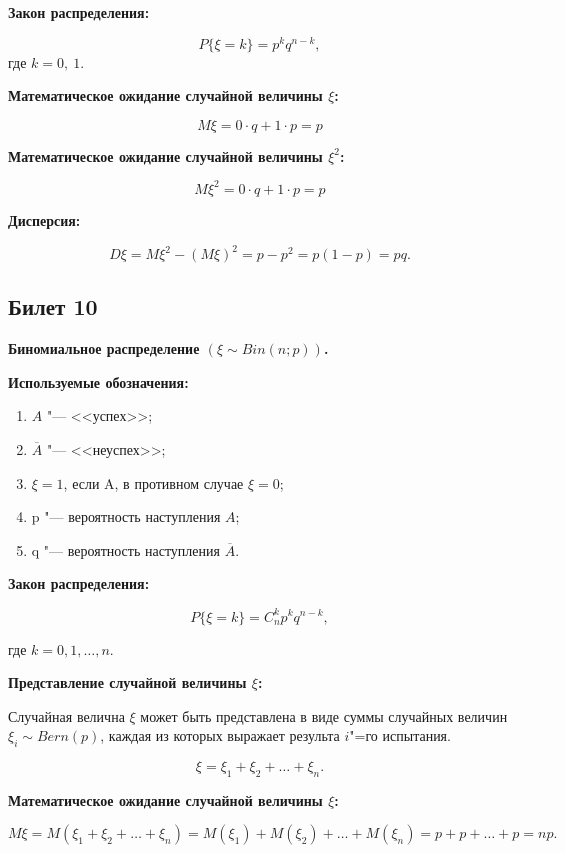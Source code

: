 \textbf{Закон распределения:}
\smallskip

\[
    P\{\xi = k\} = p^k q^{n - k},  
\]
где $k = 0,\ 1$.
\bigskip

\textbf{Математическое ожидание случайной величины $\xi$:}
\smallskip

\[
    M\xi = 0\cdot q + 1\cdot p = p  
\]
\bigskip

\textbf{Математическое ожидание случайной величины $\xi^2$:}
\smallskip

\[
    M\xi^2 = 0\cdot q + 1\cdot p = p  
\]
\bigskip

\textbf{Дисперсия:}
\smallskip 

\[
    D\xi = M\xi^2 - (M\xi)^2 = p - p^2 = p (1 - p) = pq.  
\]

\subsection{Билет 10}

\textbf{Биномиальное распределение $(\xi \sim Bin(n; p))$.}
\bigskip

\textbf{Используемые обозначения:}
    \smallskip

    \begin{enumerate}
        \item{$A$ "--- <<успех>>;}
        \item{$\overline{A}$ "--- <<неуспех>>;}
        \item{$\xi = 1$, если A, в противном случае $\xi = 0$;}
        \item{p "--- вероятность наступления $A$;}
        \item{q "--- вероятность наступления $\overline{A}$.}
    \end{enumerate}
    \bigskip

\textbf{Закон распределения:}
\smallskip

\[
    P\{\xi = k\} = C^k_n p^k q^{n - k},
\]

где $k = 0, 1, \dots, n$.
\bigskip

\textbf{Представление случайной величины $\xi$:}
\smallskip

Случайная велична $\xi$ может быть представлена 
в виде суммы случайных величин $\xi_i \sim Bern(p)$, каждая из
которых выражает результа $i$"=го испытания.

\[
    \xi = \xi_1 + \xi_2 + \dots + \xi_n.
\]
\bigskip

\textbf{Математическое ожидание случайной величины $\xi$:}
\smallskip

\[
    M\xi = M(\xi_1 + \xi_2 + \dots + \xi_n) =
    M(\xi_1) + M(\xi_2) + \dots + M(\xi_n) =
    p + p + \dots + p = np.
\]
\bigskip

